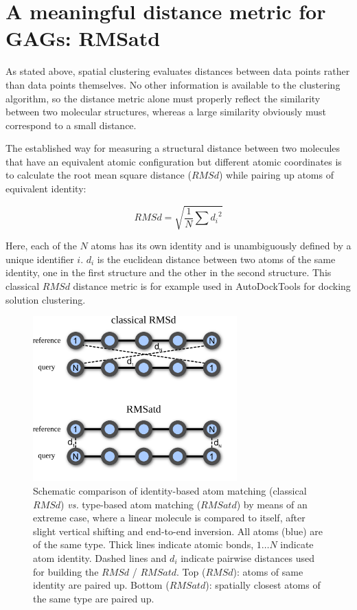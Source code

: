 \section{A meaningful distance metric for GAGs: RMSatd}

As stated above, spatial clustering evaluates distances between data points
rather than data points themselves. No other information is available to the
clustering algorithm, so the distance metric alone must properly reflect the
similarity between two molecular structures, whereas a large similarity
obviously must correspond to a small distance.

The established way for measuring a structural distance between two molecules
that have an equivalent atomic configuration but different atomic coordinates is
to calculate the root mean square distance ($RMSd$) while pairing up atoms of
equivalent identity:

\begin{equation}
RMSd = \sqrt{\frac{1}{N}\sum{{d_i}^2}}
\end{equation}

Here, each of the $N$ atoms has its own identity and is unambiguously defined by
a unique identifier $i$. $d_i$ is the euclidean distance between two atoms of
the same identity, one in the first structure and the other in the second
structure. This classical $RMSd$ distance metric is for example used in
AutoDockTools \cite{autodock4_adt_2009} for docking solution clustering.

\begin{figure}
\centering
\includegraphics[width=0.7\textwidth]{gfx/clust/RMSd_vs_RMSatd_scheme_03.png}
\caption[]{
Schematic comparison of identity-based atom matching (classical $RMSd$)
\textit{vs.} type-based atom matching ($RMSatd$) by means of an extreme case,
where a linear molecule is compared to itself, after slight vertical shifting
and end-to-end inversion. All atoms (blue) are of the same type. Thick lines
indicate atomic bonds, $1 \dots N$ indicate atom identity. Dashed lines and
$d_i$ indicate pairwise distances used for building the $RMSd$ / $RMSatd$. Top
($RMSd$): atoms of same identity are paired up. Bottom ($RMSatd$): spatially
closest atoms of the same type are paired up.
}
\label{fig:clust:rmsd_vs_rmsatd}
\end{figure}

